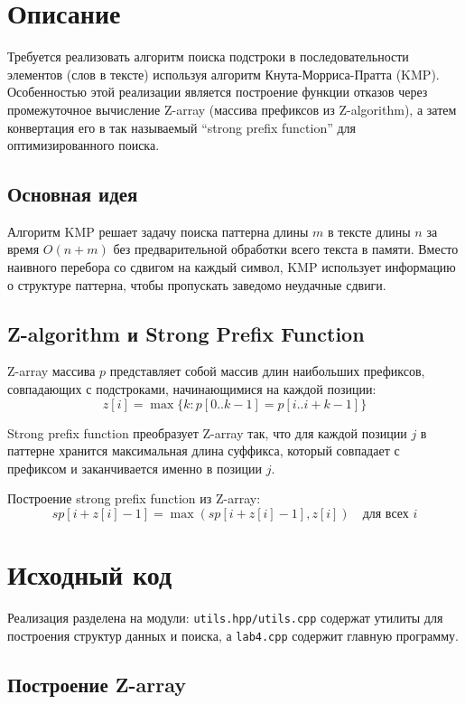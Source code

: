 \section{Описание}

Требуется реализовать алгоритм поиска подстроки в последовательности элементов (слов в тексте) используя алгоритм Кнута-Морриса-Пратта (KMP). Особенностью этой реализации является построение функции отказов через промежуточное вычисление Z-array (массива префиксов из Z-algorithm), а затем конвертация его в так называемый \enquote{strong prefix function} для оптимизированного поиска.

\subsection{Основная идея}

Алгоритм KMP решает задачу поиска паттерна длины $m$ в тексте длины $n$ за время $O(n + m)$ без предварительной обработки всего текста в памяти. Вместо наивного перебора со сдвигом на каждый символ, KMP использует информацию о структуре паттерна, чтобы пропускать заведомо неудачные сдвиги.

\subsection{Z-algorithm и Strong Prefix Function}

Z-array массива $p$ представляет собой массив длин наибольших префиксов, совпадающих с подстроками, начинающимися на каждой позиции:
\[
z[i] = \max\{k : p[0..k-1] = p[i..i+k-1]\}
\]

Strong prefix function преобразует Z-array так, что для каждой позиции $j$ в паттерне хранится максимальная длина суффикса, который совпадает с префиксом и заканчивается именно в позиции $j$.

Построение strong prefix function из Z-array:
\[
sp[i + z[i] - 1] = \max(sp[i + z[i] - 1], z[i]) \quad \text{для всех } i
\]

\pagebreak

\section{Исходный код}

Реализация разделена на модули: \texttt{utils.hpp/utils.cpp} содержат утилиты для построения структур данных и поиска, а \texttt{lab4.cpp} содержит главную программу.

\subsection{Построение Z-array}

